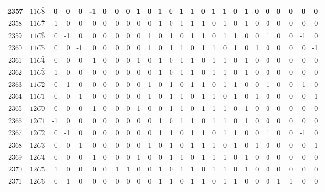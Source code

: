 \documentclass[12 pt]{article}%
\begin{document}
\begin{tiny}
\begin{centering}
\begin{longtable}{|c|c||rrrrrrrrrrrrrrrrrrrrrrrr|}
      \hline
      2357 & $11C\bar8$ & 0 & 0 & 0 & -1 & 0 & 0 & 0 & 1 & 0 & 1 & 0 & 1 & 1 & 0 & 1 & 1 & 0 & 1 & 0 & 0 & 0 & 0 & 0 & 0 \\
      \hline
      2358 & $11C\bar7$ & -1 & 0 & 0 & 0 & 0 & 0 & 0 & 0 & 0 & 1 & 0 & 1 & 1 & 1 & 0 & 1 & 0 & 1 & 0 & 0 & 0 & 0 & 0 & 0 \\
      \hline
      2359 & $11C\bar6$ & 0 & -1 & 0 & 0 & 0 & 0 & 0 & 0 & 1 & 0 & 1 & 0 & 1 & 1 & 0 & 1 & 1 & 0 & 0 & 1 & 0 & 0 & -1 & 0 \\
      \hline
      2360 & $11C\bar5$ & 0 & 0 & -1 & 0 & 0 & 0 & 0 & 0 & 1 & 0 & 1 & 1 & 0 & 1 & 1 & 0 & 1 & 0 & 1 & 0 & 0 & 0 & 0 & -1 \\
      \hline
      2361 & $11C\bar4$ & 0 & 0 & 0 & -1 & 0 & 0 & 0 & 1 & 0 & 1 & 0 & 1 & 1 & 0 & 1 & 1 & 0 & 1 & 0 & 0 & 0 & 0 & 0 & 0 \\
      \hline
      2362 & $11C\bar3$ & -1 & 0 & 0 & 0 & 0 & 0 & 0 & 0 & 0 & 1 & 0 & 1 & 1 & 0 & 1 & 1 & 0 & 1 & 0 & 0 & 0 & 0 & 0 & 0 \\
      \hline
      2363 & $11C\bar2$ & 0 & -1 & 0 & 0 & 0 & 0 & 0 & 0 & 1 & 0 & 1 & 0 & 1 & 1 & 0 & 1 & 1 & 0 & 0 & 1 & 0 & 0 & -1 & 0 \\
      \hline
      2364 & $11C\bar1$ & 0 & 0 & -1 & 0 & 0 & 0 & 0 & 0 & 1 & 0 & 1 & 1 & 0 & 1 & 1 & 0 & 1 & 0 & 1 & 0 & 0 & 0 & 0 & -1 \\
      \hline
      2365 & $12C0$ & 0 & 0 & 0 & -1 & 0 & 0 & 0 & 1 & 0 & 0 & 1 & 1 & 0 & 1 & 1 & 1 & 0 & 1 & 0 & 0 & 0 & 0 & 0 & 0 \\
      \hline
      2366 & $12C1$ & -1 & 0 & 0 & 0 & 0 & 0 & 0 & 0 & 0 & 1 & 0 & 1 & 1 & 0 & 1 & 1 & 0 & 1 & 0 & 0 & 0 & 0 & 0 & 0 \\
      \hline
      2367 & $12C2$ & 0 & -1 & 0 & 0 & 0 & 0 & 0 & 0 & 0 & 1 & 1 & 0 & 1 & 1 & 0 & 1 & 1 & 0 & 0 & 1 & 0 & 0 & -1 & 0 \\
      \hline
      2368 & $12C3$ & 0 & 0 & -1 & 0 & 0 & 0 & 0 & 0 & 1 & 0 & 1 & 0 & 1 & 1 & 1 & 0 & 1 & 0 & 1 & 0 & 0 & 0 & 0 & -1 \\
      \hline
      2369 & $12C4$ & 0 & 0 & 0 & -1 & 0 & 0 & 0 & 1 & 0 & 0 & 1 & 1 & 0 & 1 & 1 & 1 & 0 & 1 & 0 & 0 & 0 & 0 & 0 & 0 \\
      \hline
      2370 & $12C5$ & -1 & 0 & 0 & 0 & 0 & -1 & 1 & 0 & 0 & 1 & 0 & 1 & 1 & 0 & 1 & 1 & 0 & 1 & 0 & 0 & 0 & 0 & 0 & 0 \\
      \hline
      2371 & $12C6$ & 0 & -1 & 0 & 0 & 0 & 0 & 0 & 0 & 0 & 1 & 1 & 0 & 1 & 1 & 0 & 1 & 1 & 0 & 0 & 0 & 1 & -1 & 0 & 0 \\

\end{longtable}
\end{centering}
\end{tiny}
\end{document}
